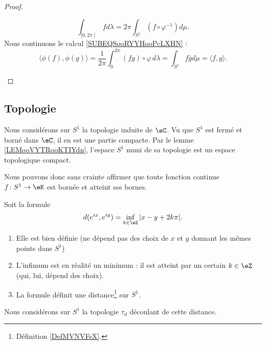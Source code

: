 \begin{proof}
\begin{subproof}
		\begin{equation}
			\int_{\mathopen[ 0 , 2\pi \mathclose[}fd\lambda=2\pi\int_{S^1}(f\circ \varphi^{-1})d\mu.
		\end{equation}
		Nous continuons le calcul \eqref{SUBEQSooRYYHooPcLXHN} :
		\begin{equation}
			\langle \phi(f), \phi(g)\rangle =\frac{1}{ 2\pi }\int_0^{2\pi}(fg)\circ\varphi\, d\lambda=\int_{S^1}f\bar gd\mu=\langle f, g\rangle .
		\end{equation}
	\end{subproof}
\end{proof}

\subsection{Topologie}

Nous considérons sur \( S^1\) la topologie induite de \( \eC\). Vu que \( S^1\) est fermé et borné dans \( \eC\), il en est une partie compacte. Par le lemme \ref{LEMooVYTRooKTIYdn}, l'espace \( S^1\) muni de sa topologie est un espace topologique compact.

Nous pouvons donc sans crainte affirmer que toute fonction continue \( f\colon S^1\to \eK\) est bornée et atteint ses bornes.

\begin{propositionDef}      \label{PROPooEQDBooDfOrTZ}
	Soit la formule
	\begin{equation}
		d( e^{ix},  e^{iy})=\inf_{k\in \eZ}| x-y+2k\pi |.
	\end{equation}
	\begin{enumerate}
		\item
		      Elle est bien définie (ne dépend pas des choix de \( x\) et \( y\) donnant les mêmes points dans \( S^1\))
		\item
		      L'infimum est en réalité un minimum : il est atteint par un certain \( k\in \eZ\) (qui, lui, dépend des choix).
		\item
		      La formule définit une distance\footnote{Définition \ref{DefMVNVFsX}.} sur \( S^1\).
	\end{enumerate}
	Nous considérons sur \( S^1\) la topologie \( \tau_d\) découlant de cette distance.
\end{propositionDef}


